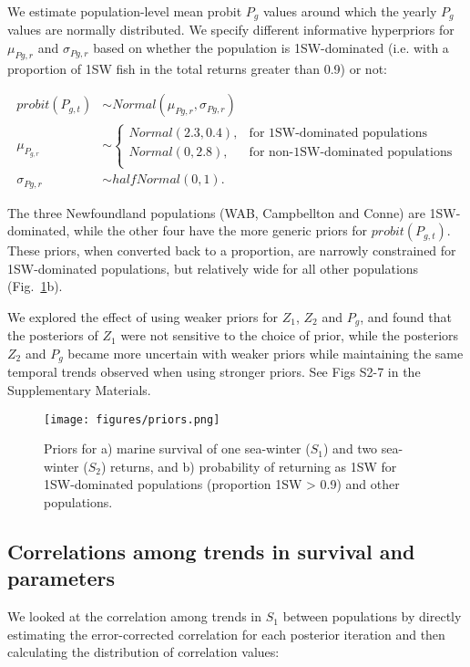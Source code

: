 \documentclass[12pt]{article}
\newcommand{\So}{$S_{1}$\xspace}
\newcommand{\St}{$S_{2}$\xspace}
\newcommand{\Pg}{$P_g$\xspace}
\newcommand{\prmu}{$\mu_{Pg,r}$\xspace}
\newcommand{\prsig}{$\sigma_{Pg,r}$\xspace}
\begin{document}
We estimate population-level mean probit \Pg values around which the yearly \Pg
values are normally distributed. We specify different informative hyperpriors
for \prmu and \prsig based on whether the population is 1SW-dominated (i.e.
with a proportion of 1SW fish in the total returns greater than 0.9) or not:

\begin{align}
    probit(P_{g,t}) &\sim Normal(\mu_{Pg,r}, \sigma_{Pg,r}) \\
    \mu_{P_{g,r}} &\sim
    \begin{cases}
       Normal(2.3, 0.4),  &\text{for 1SW-dominated populations} \\
       Normal(0, 2.8), &\text{for non-1SW-dominated populations} \\
   \end{cases} \\
    \sigma_{Pg,r} &\sim halfNormal(0, 1).
\end{align}

The three Newfoundland populations (WAB, Campbellton and Conne) are
1SW-dominated, while the other four have the more generic priors for $probit(P_{g,t})$.
These priors, when converted back to a proportion, are narrowly constrained
for 1SW-dominated populations, but relatively wide for all other populations
(Fig.~\ref{fig:priors}b).

We explored the effect of using weaker priors for $Z_1$, $Z_2$ and \Pg, and found
that the posteriors of $Z_1$ were not sensitive to the choice of prior, while the 
 posteriors $Z_2$ and \Pg became more uncertain with weaker priors while maintaining
 the same temporal trends observed when using stronger priors. See Figs S2-7 in the Supplementary Materials.

\begin{figure}[htbp] \centering
    \texttt{[image: figures/priors.png]} \caption{Priors
        for a) marine survival of one sea-winter (\So) and two sea-winter
        (\St) returns, and b) probability of returning as 1SW for
        1SW-dominated populations (proportion 1SW > 0.9) and other populations.}
    \label{fig:priors}
\end{figure}


\subsection*{Correlations among trends in survival and parameters}

We looked at the correlation among trends in \So between populations by
directly estimating the error-corrected correlation for each posterior
iteration and then calculating the distribution of correlation values:
\end{document}
